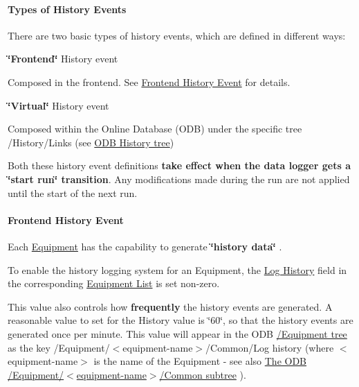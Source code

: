  \par
\hypertarget{F_History_logging_F_History_Event_Types}{}\paragraph{Types of History Events}\label{F_History_logging_F_History_Event_Types}
There are two basic types of history events, which are defined in different ways:


\begin{DoxyItemize}
\item {\bfseries \char`\"{}Frontend\char`\"{}} History event \par
 Composed in the frontend. See \hyperlink{F_History_logging_F_Frontend_History_Event}{Frontend History Event} for details.


\item {\bfseries \char`\"{}Virtual\char`\"{}} History event \par
Composed within the Online Database (ODB) under the specific tree /History/Links (see \hyperlink{F_History_logging_F_ODB_History_tree}{ODB History tree})


\end{DoxyItemize}

Both these history event definitions {\bfseries take effect when the data logger gets a \char`\"{}start run\char`\"{} transition}. Any modifications made during the run are not applied until the start of the next run.

\par
 

 \par
 \label{F_History_logging_idx_History_events}
\hypertarget{F_History_logging_idx_History_events}{}
 \hypertarget{F_History_logging_F_Frontend_History_Event}{}\paragraph{Frontend History Event}\label{F_History_logging_F_Frontend_History_Event}
Each \hyperlink{FrontendOperation_FE_sw_equipment}{Equipment} has the capability to generate {\bfseries  \char`\"{}history data\char`\"{} }. \par
   To enable the history logging system for an Equipment, the \hyperlink{FE_table_FE_tbl_History}{Log History} field in the corresponding \hyperlink{FrontendOperation_FE_Equipment_list}{Equipment List} is set non-\/zero.



This value also controls how {\bfseries frequently} the history events are generated. A reasonable value to set for the History value is \char`\"{}60\char`\"{}, so that the history events are generated once per minute. This value will appear in the ODB \hyperlink{FE_ODB_equipment_tree}{/Equipment tree} as the key /Equipment/$<$equipment-\/name$>$/Common/Log history (where $<$equipment-\/name$>$ is the name of the Equipment -\/ see also \hyperlink{FE_ODB_equipment_tree_FE_ODB_equipment_common}{The ODB /Equipment/$<$equipment-\/name$>$/Common subtree} ).

